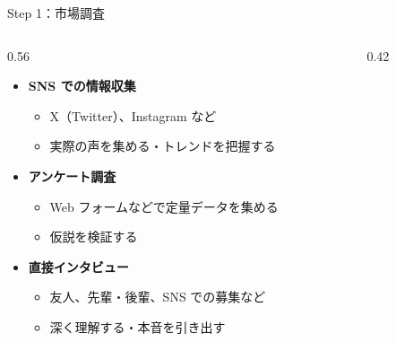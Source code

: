 \documentclass[aspectratio=169]{beamer}
\begin{document}
\begin{frame}{Step 1：市場調査}
\begin{columns}[T]
\begin{column}{0.56\textwidth}
\small
\begin{itemize}
  \item \textbf{SNS での情報収集}
  \begin{itemize}\footnotesize
    \item X（Twitter）、Instagram など
    \item 実際の声を集める・トレンドを把握する
  \end{itemize}
  \item \textbf{アンケート調査}
  \begin{itemize}\footnotesize
    \item Web フォームなどで定量データを集める
    \item 仮説を検証する
  \end{itemize}
  \item \textbf{直接インタビュー}
  \begin{itemize}\footnotesize
    \item 友人、先輩・後輩、SNS での募集など
    \item 深く理解する・本音を引き出す
  \end{itemize}
\end{itemize}
\end{column}
\begin{column}{0.42\textwidth}
\end{column}
\end{columns}
\end{frame}
\end{document}
